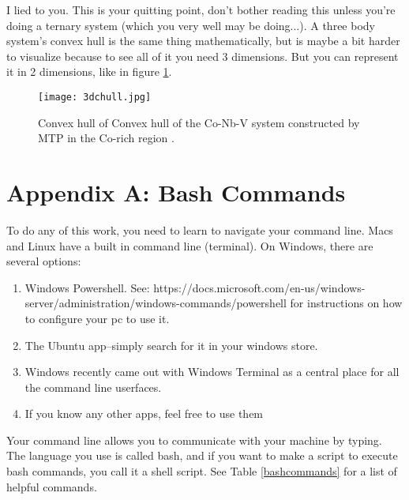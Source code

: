 \documentclass{article}
\begin{document}
I lied to you. This is your quitting point, don't bother reading this unless you're doing a
ternary system (which you very well may be doing...). A three body system's convex hull
is the same thing mathematically, but is maybe a bit harder to
visualize because to see all of it you need 3 dimensions.  But you can
represent it in 2 dimensions, like in figure \ref{fig:3dchull}.

\begin{figure}[h]
  \centering
  \texttt{[image: 3dchull.jpg]}
  \caption{Convex hull of Convex hull of the Co-Nb-V system
    constructed by MTP in the Co-rich region
    \cite{gubaev2019accelerating}.  }
  \label{fig:3dchull}
\end{figure}


\FloatBarrier

\section*{Appendix A: Bash Commands} \label{sec:bash}

To do any of this work, you need to learn to navigate your command
line. Macs and Linux have a built in command line (terminal). On
Windows, there are several options:
\begin{enumerate}
  \item{Windows Powershell. See:
      https://docs.microsoft.com/en-us/windows-
      server/administration/windows-commands/powershell
      for instructions on how to configure your pc to use it.}
  \item{The Ubuntu app--simply search for it in your windows store.}
  \item{Windows recently came out with Windows Terminal as a 
      central place for all the command line userfaces.}
  \item{If you know any other apps, feel free to use them}
\end{enumerate}
Your command line allows you to communicate with your machine by
typing. The language you use is called bash, and if you want to make a
script to execute bash commands, you call it a shell script. See Table
\ref{bashcommands} for a list of helpful commands.  
\end{document}
